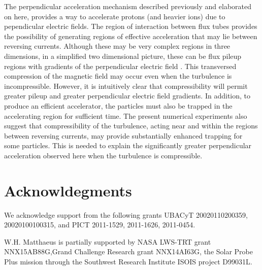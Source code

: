 \documentclass[%
aip,pop,amsmath,amssymb,
 reprint,%
]{revtex4-1}
\begin{document}
The perpendicular acceleration mechanism described previously\cite{PD1,Dalena2012} and elaborated on here, provides a way to accelerate protons (and heavier ions) due to pependicular electric fields.
The region of interaction between flux tubes provides the possibility of generating regions of effective
 acceleration that may lie between reversing currents. Although these may be very complex
 regions in three dimensions, in a simplified two dimensional picture, these can be flux
 pileup regions with gradients of the perpendicular electric field . This transversed
 compression of the  magnetic field may occur even when the turbulence is incompressible. However, it is 
 intuitively clear that compressibility
will permit greater pileup and greater perpendicular electric field gradients. In addition,
to produce an efficient accelerator, the particles must also be trapped in the accelerating 
region for sufficient time. The present numerical experiments 
also suggest that compressibility of the turbulence, acting near and within the regions 
between reversing 
currents, may provide substantially enhanced trapping for some particles. This is needed to 
explain the significantly greater perpendicular acceleration observed here when
the turbulence is compressible.  
\section*{Acknowldegments}
 
We acknowledge support from the following grants UBACyT 20020110200359, 20020100100315,
and PICT 2011-1529, 2011-1626, 2011-0454.

W.H. Matthaeus is partially supported by NASA LWS-TRT grant 
NNX15AB88G,Grand Challenge Research grant NNX14AI63G,
the Solar Probe Plus mission through the  Southwest Research Institute ISOIS 
project D99031L.
\vspace*{1cm}
\nocite{*}

\end{document}
